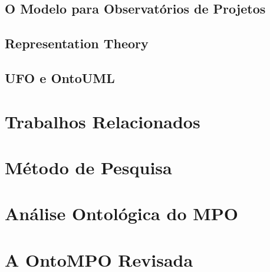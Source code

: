 \documentclass[12pt]{article}
\begin{document}
\subsection{O Modelo para Observatórios de Projetos}
\label{sec:mpo}

\subsection{Representation Theory}
\label{sec:representation-theory}

\subsection{UFO e OntoUML}
\label{sec:ufo}

\section{Trabalhos Relacionados}
\label{sec:relacionados}

\section{Método de Pesquisa}
\label{sec:metodo}

\section{Análise Ontológica do MPO}
\label{sec:analise}

\section{A OntoMPO Revisada}
\label{sec:ontompo}
\end{document}
